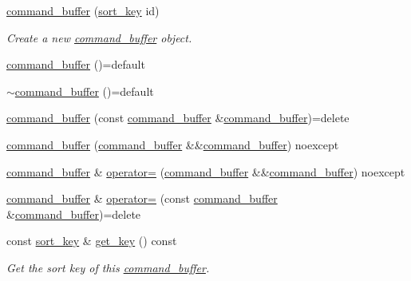 \begin{DoxyCompactItemize}
\item 
\mbox{\hyperlink{classmoka_1_1command__buffer_a8ed8ee9b65a14f30f249ca63e19ccb10}{command\+\_\+buffer}} (\mbox{\hyperlink{namespacemoka_afa30a616e67b83113ebdb857555cf2bb}{sort\+\_\+key}} id)
\begin{DoxyCompactList}\small\item\em Create a new \mbox{\hyperlink{classmoka_1_1command__buffer}{command\+\_\+buffer}} object. \end{DoxyCompactList}\item 
\mbox{\hyperlink{classmoka_1_1command__buffer_a911db965f8ff1133a8916a893dc4d663}{command\+\_\+buffer}} ()=default
\item 
\mbox{\hyperlink{classmoka_1_1command__buffer_a33e704c43852909e8ffd2bf415039eeb}{$\sim$command\+\_\+buffer}} ()=default
\item 
\mbox{\hyperlink{classmoka_1_1command__buffer_a321cffef746d5dccd113f895ddb30890}{command\+\_\+buffer}} (const \mbox{\hyperlink{classmoka_1_1command__buffer}{command\+\_\+buffer}} \&\mbox{\hyperlink{classmoka_1_1command__buffer}{command\+\_\+buffer}})=delete
\item 
\mbox{\hyperlink{classmoka_1_1command__buffer_a57ccb6f315b8ed5bd0c879d792bbef21}{command\+\_\+buffer}} (\mbox{\hyperlink{classmoka_1_1command__buffer}{command\+\_\+buffer}} \&\&\mbox{\hyperlink{classmoka_1_1command__buffer}{command\+\_\+buffer}}) noexcept
\item 
\mbox{\hyperlink{classmoka_1_1command__buffer}{command\+\_\+buffer}} \& \mbox{\hyperlink{classmoka_1_1command__buffer_af9b91d8223cd261be50f18fcd6b31efa}{operator=}} (\mbox{\hyperlink{classmoka_1_1command__buffer}{command\+\_\+buffer}} \&\&\mbox{\hyperlink{classmoka_1_1command__buffer}{command\+\_\+buffer}}) noexcept
\item 
\mbox{\hyperlink{classmoka_1_1command__buffer}{command\+\_\+buffer}} \& \mbox{\hyperlink{classmoka_1_1command__buffer_a0f05e599238d1d0b184cb163cacf4e10}{operator=}} (const \mbox{\hyperlink{classmoka_1_1command__buffer}{command\+\_\+buffer}} \&\mbox{\hyperlink{classmoka_1_1command__buffer}{command\+\_\+buffer}})=delete
\item 
const \mbox{\hyperlink{namespacemoka_afa30a616e67b83113ebdb857555cf2bb}{sort\+\_\+key}} \& \mbox{\hyperlink{classmoka_1_1command__buffer_ae9f8480f6f86739d0176b7646f699a85}{get\+\_\+key}} () const
\begin{DoxyCompactList}\small\item\em Get the sort key of this \mbox{\hyperlink{classmoka_1_1command__buffer}{command\+\_\+buffer}}. \end{DoxyCompactList}\item 

\end{DoxyCompactItemize}

